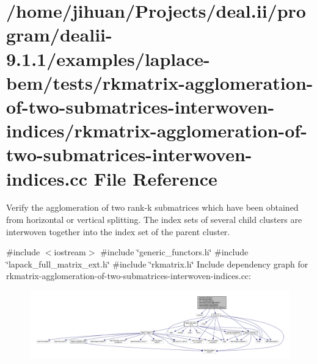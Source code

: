 \hypertarget{rkmatrix-agglomeration-of-two-submatrices-interwoven-indices_8cc}{}\section{/home/jihuan/\+Projects/deal.ii/program/dealii-\/9.1.1/examples/laplace-\/bem/tests/rkmatrix-\/agglomeration-\/of-\/two-\/submatrices-\/interwoven-\/indices/rkmatrix-\/agglomeration-\/of-\/two-\/submatrices-\/interwoven-\/indices.cc File Reference}
\label{rkmatrix-agglomeration-of-two-submatrices-interwoven-indices_8cc}


Verify the agglomeration of two rank-\/k submatrices which have been obtained from horizontal or vertical splitting. The index sets of several child clusters are interwoven together into the index set of the parent cluster.  


{\ttfamily \#include $<$iostream$>$}\newline
{\ttfamily \#include \char`\"{}generic\+\_\+functors.\+h\char`\"{}}\newline
{\ttfamily \#include \char`\"{}lapack\+\_\+full\+\_\+matrix\+\_\+ext.\+h\char`\"{}}\newline
{\ttfamily \#include \char`\"{}rkmatrix.\+h\char`\"{}}\newline
Include dependency graph for rkmatrix-\/agglomeration-\/of-\/two-\/submatrices-\/interwoven-\/indices.cc\+:\nopagebreak
\begin{figure}[H]
\begin{center}
\leavevmode
\includegraphics[width=350pt]{rkmatrix-agglomeration-of-two-submatrices-interwoven-indices_8cc__incl}
\end{center}
\end{figure}
